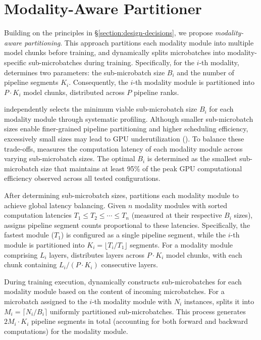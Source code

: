 \section{Modality-Aware Partitioner}
\label{section:modality-aware-partitioning}

Building on the principles in \S\ref{section:design-decisions},
we propose \emph{modality-aware partitioning}.
This approach partitions each modality module into multiple model chunks before training,
and dynamically splits microbatches into modality-specific sub-microbatches during training.
Specifically, for the $i$-th modality, {\sys} determines two parameters:
the sub-microbatch size $B_i$ and the number of pipeline segments $K_i$.
Consequently, the $i$-th modality module is partitioned into $P \cdot K_i$ model chunks,
distributed across $P$ pipeline ranks.

\sys{} independently selects the minimum viable sub-microbatch size $B_i$ for each modality module through systematic profiling.
Although smaller sub-microbatch sizes enable finer-grained pipeline partitioning and higher scheduling efficiency,
excessively small sizes may lead to GPU underutilization ().
To balance these trade-offs, \sys{} measures the computation latency of each modality module across varying sub-microbatch sizes.
The optimal $B_i$ is determined as the smallest sub-microbatch size that maintains at least 95\%
of the peak GPU computational efficiency observed across all tested configurations.

After determining sub-microbatch sizes, \sys{} partitions each modality module to achieve global latency balancing.
Given $n$ modality modules with sorted computation latencies $T_1 \leq T_2 \leq \cdots \leq T_n$
(measured at their respective $B_i$ sizes),
\sys{} assigns pipeline segment counts proportional to these latencies.
Specifically, the fastest module ($T_1$) is configured as a single pipeline segment,
while the $i$-th module is partitioned into $K_i = \lfloor T_i / T_1 \rfloor$ segments.
For a modality module comprising $L_i$ layers,
\sys{} distributes layers across $P \cdot K_i$ model chunks,
with each chunk containing $L_i/(P \cdot K_i)$ consecutive layers.

During training execution, \sys{} dynamically constructs sub-microbatches for each modality module
based on the content of incoming microbatches.
For a microbatch assigned to the $i$-th modality module with $N_i$ instances,
\sys{} splits it into $M_i = \lceil N_i/B_i \rceil$ uniformly partitioned sub-microbatches.
This process generates $2 M_i \cdot K_i$ pipeline segments in total
(accounting for both forward and backward computations) for the modality module.

